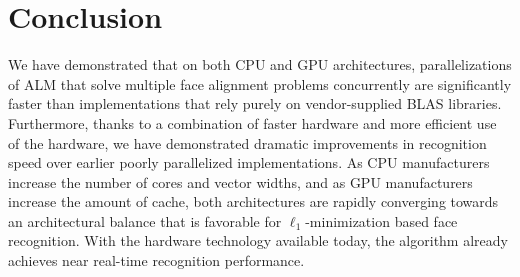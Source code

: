 \section{Conclusion}
We have demonstrated that on both CPU and GPU architectures, parallelizations of
ALM that solve multiple face alignment problems concurrently are significantly
faster than implementations that rely purely on vendor-supplied BLAS libraries.
Furthermore, thanks to a combination of faster hardware and more efficient use
of the hardware, we have demonstrated dramatic improvements in recognition
speed over earlier poorly parallelized implementations.
As CPU manufacturers increase the number of cores and vector widths, and as GPU 
manufacturers increase the amount
of cache, both architectures are rapidly converging towards an architectural balance
that is favorable for $\ell_1$-minimization based face recognition.
With the hardware technology available today, the algorithm already achieves near real-time
recognition performance.

